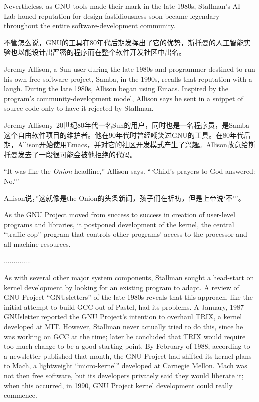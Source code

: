 \ifdefined\eng
Nevertheless, as GNU tools made their mark in the late 1980s, Stallman's AI Lab-honed reputation for design fastidiousness soon became legendary throughout the entire software-development community.
\fi

\ifdefined\chs
不管怎么说，GNU的工具在80年代后期发挥出了它的优势，斯托曼的人工智能实验也以能设计出严密的程序而在整个软件开发社区中出名。
\fi

\ifdefined\eng
Jeremy Allison, a Sun user during the late 1980s and programmer destined to run his own free software project, Samba, in the 1990s, recalls that reputation with a laugh. During the late 1980s, Allison began using Emacs. Inspired by the program's community-development model, Allison says he sent in a snippet of source code only to have it rejected by Stallman.
\fi

\ifdefined\chs
Jeremy Allison，20世纪80年代一名Sun的用户，同时也是一名程序员，是Samba这个自由软件项目的维护者。他在90年代时曾经嘲笑过GNU的工具。在80年代后期，Allison开始使用Emacs，并对它的社区开发模式产生了兴趣。Allison故意给斯托曼发去了一段很可能会被他拒绝的代码。
\fi

\ifdefined\eng
``It was like the \textit{Onion} headline,'' Allison says. ``\hspace{0.01in}`Child's prayers to God answered: No.'\hspace{0.01in}''
\fi

\ifdefined\chs
Allison说，”这就像是the Onion的头条新闻，孩子们在祈祷，但是上帝说‘不’”。
\fi

\ifdefined\eng
As the GNU Project moved from success to success in creation of user-level programs and libraries, it postponed development of the kernel, the central ``traffic cop'' program that controls other programs' access to the processor and all machine resources.
\fi

\ifdefined\chs
..............
\fi

\ifdefined\eng
As with several other major system components, Stallman sought a head-start on kernel development by looking for an existing program to adapt. A review of GNU Project ``GNUsletters'' of the late 1980s reveals that this approach, like the initial attempt to build GCC out of Pastel, had its problems. A January, 1987 GNUsletter reported the GNU Project's intention to overhaul TRIX, a kernel developed at MIT. However, Stallman never actually tried to do this, since he was working on GCC at the time; later he concluded that TRIX would require too much change to be a good starting point. By February of 1988, according to a newsletter published that month, the GNU Project had shifted its kernel plans to Mach, a lightweight ``micro-kernel'' developed at Carnegie Mellon. Mach was not then free software, but its developers privately said they would liberate it; when this occurred, in 1990, GNU Project kernel development could really commence.
\fi

